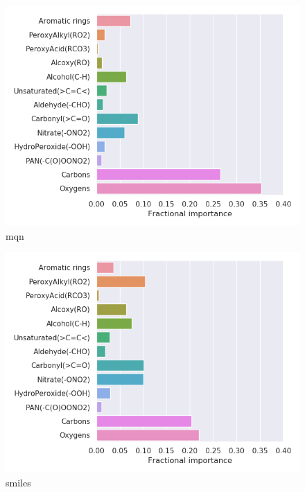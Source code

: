 \begin{subfigure}[b]{0.4\textwidth}
    \centering
    \includegraphics[width=\textwidth]{outputs/t-SNE/mqn/legend.png}
    \caption{mqn}
    \label{fig:legend_t-SNE_mqn}
\end{subfigure}
\begin{subfigure}[b]{0.4\textwidth}
    \centering
    \includegraphics[width=\textwidth]{outputs/t-SNE/smiles/legend.png}
    \caption{smiles}
    \label{fig:legend_t-SNE_smiles}
\end{subfigure}
